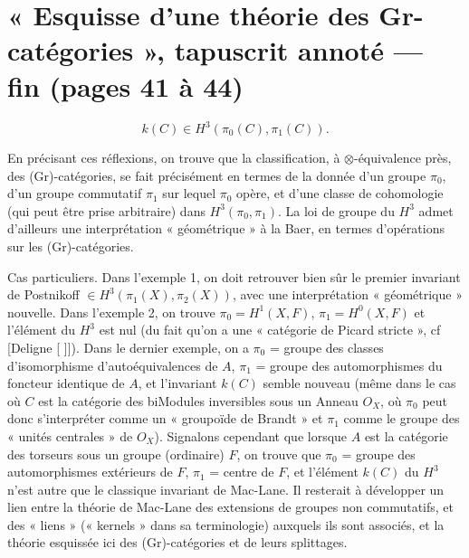 \documentclass[11pt,a4paper]{article}
\begin{document}
\section*{« Esquisse d'une théorie des Gr-catégories », tapuscrit annoté —
fin (pages 41 à 44)}

\[
k(C) \in H^{3}(\pi_{0}(C), \pi_{1}(C)).
\]

En précisant ces réflexions, on trouve que la classification, à
$\otimes$-équivalence près, des (Gr)-catégories, se fait précisément en
termes de la donnée d'un groupe $\pi_{0}$, d'un groupe commutatif $\pi_{1}$
sur lequel $\pi_{0}$ opère, et d'une classe de cohomologie (qui peut être
prise arbitraire) dans $H^{3}(\pi_{0}, \pi_{1})$. La loi de \struck{\ill}
groupe du $H^{3}$ admet d'ailleurs une interprétation « géométrique » à la
Baer, en termes d'opérations sur les (Gr)-catégories.

Cas particuliers. Dans l'exemple 1, on doit retrouver bien sûr le premier
invariant de Postnikoff $\in H^{3}(\pi_{1}(X), \pi_{2}(X))$, avec une
interprétation « géométrique » nouvelle.  Dans l'exemple 2, on trouve $\pi_{0} =
H^{1}(X,F)$, $\pi_{1} = H^{0}(X,F)$ et l'élément du $H^{3}$ est nul (du
fait qu'on a une « catégorie de Picard stricte », cf [Deligne [ ]]).
 Dans \struck{\ill} le dernier exemple, on a $\pi_{0}$ = groupe
des classes d'isomorphisme d'autoéquivalences de $A$, $\pi_{1}$ = groupe
des automorphismes du foncteur identique de $A$, et l'invariant $k(C)$
semble nouveau (même dans le cas où $C$ est la catégorie des biModules
inversibles sous un Anneau $O_{X}$, où $\pi_{0}$ peut donc s'interpréter
comme un « groupoïde de Brandt » et $\pi_{1}$ comme le groupe des « unités
centrales » de $O_{X}$). Signalons cependant que lorsque $A$ est la
catégorie des torseurs sous un groupe (ordinaire) $F$, on trouve
\struck{\ill} que $\pi_{0}$ = groupe des automorphismes extérieurs de $F$,
$\pi_{1}$ = centre de $F$, et l'élément $k(C)$ du $H^{3}$ n'est autre que
le classique invariant de Mac-Lane. Il resterait à développer un lien
 entre la théorie de Mac-Lane des extensions de
groupes non commutatifs, et des « liens » (« kernels » dans sa
terminologie) auxquels ils sont associés, et la théorie  esquissée ici des (Gr)-catégories et de leurs splittages.
\end{document}

